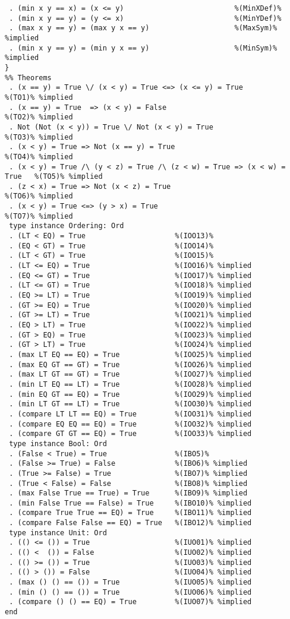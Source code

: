 \begin{Verbatim}
 . (min x y == x) = (x <= y)                          %(MinXDef)%
 . (min x y == y) = (y <= x)                          %(MinYDef)%
 . (max x y == y) = (max y x == y)                    %(MaxSym)% %implied
 . (min x y == y) = (min y x == y)                    %(MinSym)% %implied
}
%% Theorems
 . (x == y) = True \/ (x < y) = True <=> (x <= y) = True                  %(TO1)% %implied
 . (x == y) = True  => (x < y) = False                                    %(TO2)% %implied
 . Not (Not (x < y)) = True \/ Not (x < y) = True                         %(TO3)% %implied
 . (x < y) = True => Not (x == y) = True                                  %(TO4)% %implied
 . (x < y) = True /\ (y < z) = True /\ (z < w) = True => (x < w) = True   %(TO5)% %implied
 . (z < x) = True => Not (x < z) = True                                   %(TO6)% %implied
 . (x < y) = True <=> (y > x) = True                                      %(TO7)% %implied
 type instance Ordering: Ord
 . (LT < EQ) = True                     %(IOO13)%
 . (EQ < GT) = True                     %(IOO14)%
 . (LT < GT) = True                     %(IOO15)%
 . (LT <= EQ) = True                    %(IOO16)% %implied
 . (EQ <= GT) = True                    %(IOO17)% %implied
 . (LT <= GT) = True                    %(IOO18)% %implied
 . (EQ >= LT) = True                    %(IOO19)% %implied
 . (GT >= EQ) = True                    %(IOO20)% %implied
 . (GT >= LT) = True                    %(IOO21)% %implied
 . (EQ > LT) = True                     %(IOO22)% %implied
 . (GT > EQ) = True                     %(IOO23)% %implied
 . (GT > LT) = True                     %(IOO24)% %implied
 . (max LT EQ == EQ) = True             %(IOO25)% %implied
 . (max EQ GT == GT) = True             %(IOO26)% %implied
 . (max LT GT == GT) = True             %(IOO27)% %implied
 . (min LT EQ == LT) = True             %(IOO28)% %implied
 . (min EQ GT == EQ) = True             %(IOO29)% %implied
 . (min LT GT == LT) = True             %(IOO30)% %implied
 . (compare LT LT == EQ) = True         %(IOO31)% %implied
 . (compare EQ EQ == EQ) = True         %(IOO32)% %implied
 . (compare GT GT == EQ) = True         %(IOO33)% %implied
 type instance Bool: Ord
 . (False < True) = True                %(IBO5)%
 . (False >= True) = False              %(IBO6)% %implied
 . (True >= False) = True               %(IBO7)% %implied
 . (True < False) = False               %(IBO8)% %implied
 . (max False True == True) = True      %(IBO9)% %implied
 . (min False True == False) = True     %(IBO10)% %implied
 . (compare True True == EQ) = True     %(IBO11)% %implied
 . (compare False False == EQ) = True   %(IBO12)% %implied
 type instance Unit: Ord
 . (() <= ()) = True                    %(IUO01)% %implied
 . (() <  ()) = False                   %(IUO02)% %implied
 . (() >= ()) = True                    %(IUO03)% %implied
 . (() > ()) = False                    %(IUO04)% %implied
 . (max () () == ()) = True             %(IUO05)% %implied
 . (min () () == ()) = True             %(IUO06)% %implied
 . (compare () () == EQ) = True         %(IUO07)% %implied
end
\end{Verbatim}

